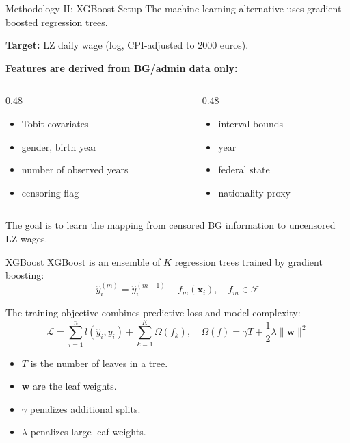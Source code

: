 \documentclass[10pt]{beamer}
\begin{document}
\begin{frame}{Methodology II: XGBoost Setup}
The machine-learning alternative uses gradient-boosted regression trees.

\vspace{0.2cm}
\textbf{Target:} LZ daily wage (log, CPI-adjusted to 2000 euros).

\vspace{0.2cm}
\textbf{Features are derived from BG/admin data only:}
\begin{columns}[T]
\begin{column}{0.48\textwidth}
\begin{itemize}
    \item Tobit covariates
    \item gender, birth year
    \item number of observed years
    \item censoring flag
\end{itemize}
\end{column}
\begin{column}{0.48\textwidth}
\begin{itemize}
    \item interval bounds
    \item year
    \item federal state
    \item nationality proxy
\end{itemize}
\end{column}
\end{columns}

\vspace{0.2cm}
The goal is to learn the mapping from censored BG information to uncensored LZ wages.
\end{frame}

\begin{frame}{XGBoost \cite{xgboost}}
XGBoost is an ensemble of $K$ regression trees trained by gradient boosting:
\[
\hat{y}_i^{(m)} = \hat{y}_i^{(m-1)} + f_m(\mathbf{x}_i), \quad f_m \in \mathcal{F}
\]

\vspace{0.2cm}
The training objective combines predictive loss and model complexity:
\[
\mathcal{L}=\sum_{i=1}^n l(\hat y_i, y_i)+\sum_{k=1}^K\Omega(f_k),
\quad
\Omega(f) = \gamma T + \frac{1}{2}\lambda\|\mathbf{w}\|^2
\]

\vspace{0.2cm}
\begin{itemize}
    \item $T$ is the number of leaves in a tree.
    \item $\mathbf{w}$ are the leaf weights.
    \item $\gamma$ penalizes additional splits.
    \item $\lambda$ penalizes large leaf weights.
\end{itemize}
\end{frame}
\end{document}
